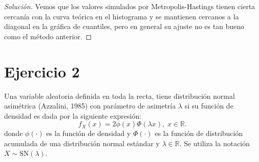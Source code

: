 \documentclass[11pt]{article}
\renewcommand{\=}[1]{\stackrel{#1}{=}} %
\newenvironment{sol}
{\begin{proof}[Solución]}
	{\end{proof}}
\theoremstyle{definition}
\theoremstyle{remark}
\begin{document}
\begin{itemize}
\begin{sol}
Vemos que los valores simulados por Metropolis-Hastings tienen cierta cercanía con la curva teórica en el histograma y se mantienen cercanos a la diagonal en la gráfica de cuantiles, pero en general su ajuste no es tan bueno como el método anterior.
\end{sol}

\end{itemize}
\section*{Ejercicio 2}
Una variable aleatoria definida en toda la recta, tiene distribución normal asimétrica (Azzalini, 1985)
con parámetro de asimetría $\lambda$ si su función de densidad es dada por la siguiente expresión:
$$f_X(x)=2\phi(x)\Phi(\lambda x),\;x\in\mathbb{R}.$$
donde $\phi(\cdot)$ es la 
función de densidad y $\Phi(\cdot)$ es la función de distribución acumulada de una distribución normal estándar y $\lambda\in\mathbb{R}$. Se utiliza la notación $X\sim \text{SN}(\lambda)$.
\end{document}
